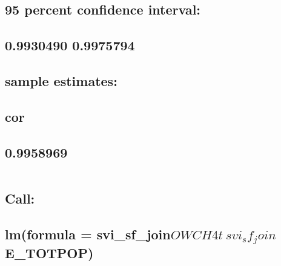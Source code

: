 \documentclass[
  12pt,
]{article}
\begin{document}
\hypertarget{percent-confidence-interval-1}{%
\subsection{95 percent confidence
interval:}\label{percent-confidence-interval-1}}

\hypertarget{section-12}{%
\subsection{0.9930490 0.9975794}\label{section-12}}

\hypertarget{sample-estimates-1}{%
\subsection{sample estimates:}\label{sample-estimates-1}}

\hypertarget{cor-1}{%
\subsection{cor}\label{cor-1}}

\hypertarget{section-13}{%
\subsection{0.9958969}\label{section-13}}

\begin{verbatim}
\end{verbatim}

\hypertarget{section-14}{%
\subsection{}\label{section-14}}

\hypertarget{call-1}{%
\subsection{Call:}\label{call-1}}

\hypertarget{lmformula-svi_sf_joinowch4t-svi_sf_joine_totpop}{%
\subsection{\texorpdfstring{lm(formula =
svi\_sf\_join\(OWCH4t ~ svi_sf_join\)E\_TOTPOP)}{lm(formula = svi\_sf\_joinOWCH4t \textasciitilde{} svi\_sf\_joinE\_TOTPOP)}}\label{lmformula-svi_sf_joinowch4t-svi_sf_joine_totpop}}

\hypertarget{section-15}{%
\subsection{}\label{section-15}}
\end{document}
